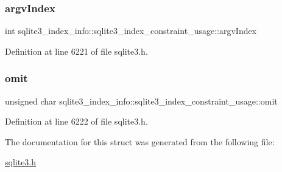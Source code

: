 \subsubsection{\texorpdfstring{argv\+Index}{argvIndex}}
{\footnotesize\ttfamily int sqlite3\+\_\+index\+\_\+info\+::sqlite3\+\_\+index\+\_\+constraint\+\_\+usage\+::argv\+Index}



Definition at line 6221 of file sqlite3.\+h.

\mbox{\label{structsqlite3__index__info_1_1sqlite3__index__constraint__usage_ad07fa17d30e4fb3abe23ceaf84edf0ef}} 
\subsubsection{\texorpdfstring{omit}{omit}}
{\footnotesize\ttfamily unsigned char sqlite3\+\_\+index\+\_\+info\+::sqlite3\+\_\+index\+\_\+constraint\+\_\+usage\+::omit}



Definition at line 6222 of file sqlite3.\+h.



The documentation for this struct was generated from the following file\+:\begin{DoxyCompactItemize}
\item 
\mbox{\hyperlink{sqlite3_8h}{sqlite3.\+h}}\end{DoxyCompactItemize}
